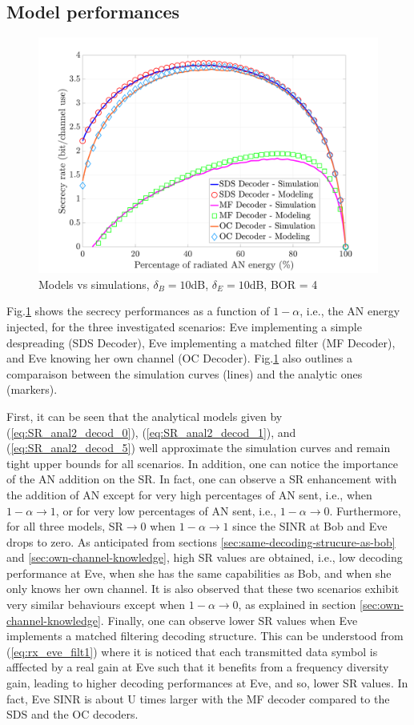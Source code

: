 \documentclass[journal,comsoc]{IEEEtran}
\let\MYoriglatexcaption\caption
\renewcommand{\caption}[2][\relax]{\MYoriglatexcaption[#2]{#2}}
\begin{document}
\subsection{Model performances}
\begin{figure}[h!t]
	\centering
	\includegraphics[width=1\linewidth]{graphs/SISO_SR_10dB.pdf}
	\caption{Models vs simulations, $\delta_B = 10$dB,  $\delta_E = 10$dB, BOR = 4}
	\label{fig_modelvssimu}
\end{figure}
Fig.\ref{fig_modelvssimu} shows the secrecy performances as a function of $1-\alpha$, i.e., the AN energy injected, for the three investigated scenarios: Eve implementing a simple despreading (SDS Decoder), Eve implementing a matched filter (MF Decoder), and Eve knowing her own channel (OC Decoder). Fig.\ref{fig_modelvssimu} also outlines a comparaison between the simulation curves (lines) and the analytic ones (markers).

First, it can be seen that the analytical models given by (\ref{eq:SR_anal2_decod_0}), (\ref{eq:SR_anal2_decod_1}), and (\ref{eq:SR_anal2_decod_5}) well approximate the simulation curves and remain tight upper bounds for all scenarios.  In addition, one can notice the importance of the AN addition on the SR. In fact, one can observe a SR enhancement with the addition of AN except for very high percentages of AN sent, i.e., when $1-\alpha \to 1$, or for very low percentages of AN sent, i.e., $1-\alpha \to 0$. Furthermore, for all three models, SR$\to 0$ when $1-\alpha \to 1$ since the SINR at Bob and Eve drops to zero. As anticipated from sections \ref{sec:same-decoding-strucure-as-bob} and \ref{sec:own-channel-knowledge}, high SR values are obtained, i.e., low decoding performance at Eve, when she has the same capabilities as Bob, and when she only knows her own channel. It is also observed that these two scenarios exhibit very similar behaviours except when $1-\alpha \to 0$, as explained in section \ref{sec:own-channel-knowledge}. Finally, one can observe lower SR values when Eve implements a matched filtering decoding structure. This can be understood from (\ref{eq:rx_eve_filt1}) where it is  noticed that each transmitted data symbol is afffected by a real gain at Eve such that it benefits from a frequency diversity gain, leading to higher decoding performances at Eve, and so, lower SR values. In fact, Eve SINR is about U times larger with the MF decoder compared to the SDS and the OC decoders.
\end{document}
